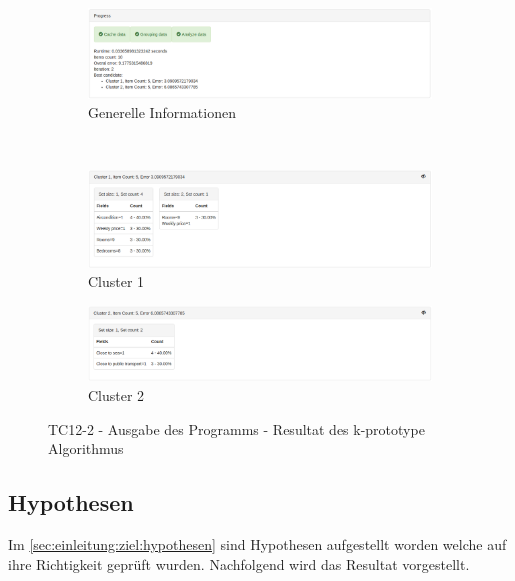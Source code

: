 \begin{figure}[H]
	\begin{subfigure}[t]{1\textwidth}
		\centering
		\includegraphics[width=1\textwidth]{images/tc12-kprototype-1}
		\caption{Generelle Informationen}
		\label{fig:testingfazit:testing:testcases:12-2-1}
	\end{subfigure} \\
	\begin{subfigure}[t]{1\textwidth}
		\centering
		\includegraphics[width=1\textwidth]{images/tc12-kprototype-2}
		\caption{Cluster 1}
		\label{fig:testingfazit:testing:testcases:12-2-2}
	\end{subfigure}
	\begin{subfigure}[t]{1\textwidth}
		\centering
		\includegraphics[width=1\textwidth]{images/tc12-kprototype-3}
		\caption{Cluster 2}
		\label{fig:testingfazit:testing:testcases:12-2-3}
	\end{subfigure}
	\caption{TC12-2 - Ausgabe des Programms - Resultat des k-prototype Algorithmus}
	\label{fig:testingfazit:testing:testcases:12-2}
\end{figure}

\subsection{Hypothesen}
\label{sec:testingfazit:testing:hypothesen}
Im \cref{sec:einleitung:ziel:hypothesen}  sind Hypothesen aufgestellt worden welche auf ihre Richtigkeit geprüft wurden. Nachfolgend wird das Resultat vorgestellt.

